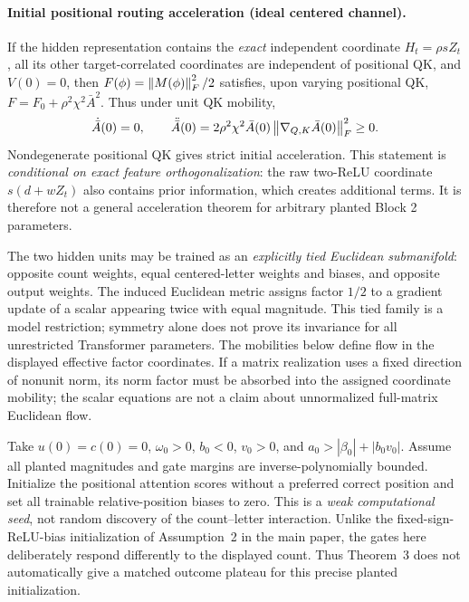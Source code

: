 \paragraph{Initial positional routing acceleration (ideal centered channel).}
If the hidden representation contains the \emph{exact} independent
coordinate $H_t=\rho sZ_t$, all its other target-correlated coordinates
are independent of positional QK, and $V(0)=0$, then
$F(\phi)=\left\lVert M(\phi)\right\rVert_F^2/2$ satisfies, upon varying positional QK,
$F=F_0+\rho^2\chi^2\bar A^2$.  Thus under unit QK mobility,
\begin{equation}\label{eq:lr-centered-accel}
 \dot{\bar A}(0)=0,\qquad
 \ddot{\bar A}(0)=2\rho^2\chi^2\bar A(0)
 \left\lVert \nabla_{Q,K}\bar A(0)\right\rVert_F^2\ge0.
\end{equation}
Nondegenerate positional QK gives strict initial acceleration.
This statement is \emph{conditional on exact feature orthogonalization}:
the raw two-ReLU coordinate
$s(d+wZ_t)$ also contains prior information, which creates additional
terms.  It is therefore not a general acceleration theorem for arbitrary
planted Block 2 parameters.

The two hidden units may be trained as an \emph{explicitly tied Euclidean
submanifold}: opposite count weights, equal centered-letter weights and
biases, and opposite output weights.  The induced Euclidean metric assigns
factor $1/2$ to a gradient update of a scalar appearing twice with equal
magnitude.  This tied family is a model restriction; symmetry alone does
not prove its invariance for all unrestricted Transformer parameters.
The mobilities below define flow in the displayed effective factor coordinates.
If a matrix realization uses a fixed direction of nonunit norm, its norm
factor must be absorbed into the assigned coordinate mobility; the scalar
equations are not a claim about unnormalized full-matrix Euclidean flow.

Take $u(0)=c(0)=0$, $\omega_0>0$, $b_0<0$, $v_0>0$, and
$a_0>|\beta_0|+|b_0v_0|$.  Assume all planted magnitudes and gate margins
are inverse-polynomially bounded.  Initialize the positional attention
scores without a preferred correct position and set all trainable
relative-position biases to zero.  This is a \emph{weak computational seed},
not random discovery of the count--letter interaction.  Unlike the
fixed-sign-ReLU-bias initialization of Assumption~2 in the main paper,
the gates here deliberately respond differently to the displayed count.
Thus Theorem~3 does not automatically give a matched outcome plateau for
this precise planted initialization.

